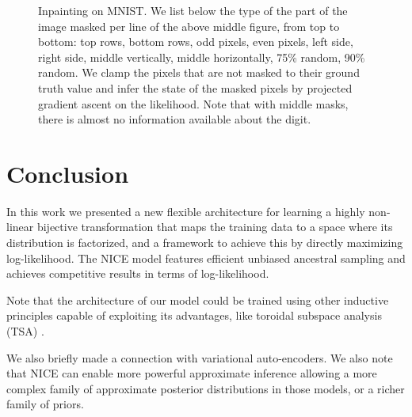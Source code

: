 \documentclass{article}
\begin{document}
\begin{figure}
    \centering {}
     
    \caption{Inpainting on MNIST. We list below the type of the part of the image
      masked per line of the above middle figure, from top to bottom: top rows, bottom rows, 
      odd pixels, even
      pixels, left side, right side, middle vertically, middle
      horizontally, 75\% random, 90\% random. We clamp the pixels that are
      not masked to their ground truth value and infer the state of the masked
      pixels by projected gradient ascent on the likelihood. Note that with middle masks, there is almost no
      information available about the digit.}
    \label{fig:mnist-inpainting}


\iffalse
    \centering \subfigure[TFD test examples]{
      \texttt{[image: tfd\_original.png]} }
    \subfigure[Initial state]{
      \texttt{[image: tfd\_init.png]} } \subfigure[MAP
      inference of the state]{
      \texttt{[image: tfd\_completed.png]} }
    \caption{Inpainting on TFD. The adopted procedure is the same as the one used in MNIST.}
    \label{fig:tfd-inpainting}
\fi
\end{figure}

\section{Conclusion}
In this work we presented a new flexible architecture for learning a highly non-linear bijective transformation 
that maps the training data to a space where its distribution is factorized, and a framework
to achieve this by directly maximizing log-likelihood. The NICE model features efficient unbiased ancestral
sampling and achieves competitive results in terms of log-likelihood.

Note that the architecture of our model could be trained using other
inductive principles capable of exploiting its advantages, like
toroidal subspace analysis (TSA) \citep{cohen2014learning}.

We also briefly made a connection with variational auto-encoders. 
We also note that NICE can enable more powerful approximate inference allowing
a more complex family of approximate posterior distributions in those models, or a richer family
of priors.
\end{document}
